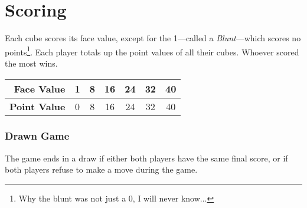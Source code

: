 \section{Scoring}
Each cube scores its face value, except for the 1---called a \textit{Blunt}---which scores no points\footnote{Why the blunt was not just a 0, I will never know...}.
Each player totals up the point values of all their cubes. Whoever scored the most wins.

\begin{center}
    \begin{tabular}{r|c|c|c|c|c|c}
        \textbf{Face Value} & 1 & 8 & 16 & 24 & 32 & 40\\\hline
        \textbf{Point Value} & 0 & 8 & 16 & 24 & 32 & 40
    \end{tabular}
\end{center}

\subsubsection{Drawn Game}
The game ends in a draw if either both players have the same final score, or if both players refuse to make a move during the game.